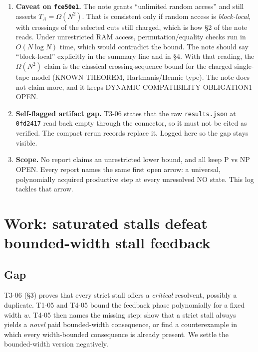 \documentclass[11pt]{article}
\theoremstyle{definition}
\begin{document}
\begin{enumerate}
 (e) T3-06 critical-pair lemma. At a stall $m_v\le b_v$, so a critical partner exists, the resolvent is false at $a$, its width is $\le|C|+|D|-2$, and $\sum_v m_vb_v\ge\sum_v m_v^2$. Correct. The Fano width-4 remark is correct: two distinct lines meet in exactly one point.
 (f) Arithmetic: RANDOM residue versus table aggregate events $440691/349518=1.2609$, matching the stated $+26.1\%$.
\item \textbf{Caveat on \texttt{fce50e1}.} The note grants ``unlimited random access'' and still asserts $T_A=\Omega(N^2)$. That is consistent only if random access is \emph{block-local}, with crossings of the selected cuts still charged, which is how \S2 of the note reads. Under unrestricted RAM access, permutation/equality checks run in $O(N\log N)$ time, which would contradict the bound. The note should say ``block-local'' explicitly in the summary line and in \S4. With that reading, the $\Omega(N^2)$ claim is the classical crossing-sequence bound for the charged single-tape model (KNOWN THEOREM, Hartmanis/Hennie type). The note does not claim more, and it keeps DYNAMIC-COMPATIBILITY-OBLIGATION1 OPEN.
\item \textbf{Self-flagged artifact gap.} T3-06 states that the raw \texttt{results.json} at \texttt{0fd2417} read back empty through the connector, so it must not be cited as verified. The compact rerun records replace it. Logged here so the gap stays visible.
\item \textbf{Scope.} No report claims an unrestricted lower bound, and all keep P vs NP OPEN. Every report names the same first open arrow: a universal, polynomially acquired productive step at every unresolved NO state. This log tackles that arrow.
\end{enumerate}

\section{Work: saturated stalls defeat bounded-width stall feedback}\label{sec:work}
\subsection*{Gap}
T3-06 (\S3) proves that every strict stall offers a \emph{critical} resolvent, possibly a duplicate. T1-05 and T4-05 bound the feedback phase polynomially for a fixed width $w$. T4-05 then names the missing step: show that a strict stall always yields a \emph{novel} paid bounded-width consequence, or find a counterexample in which every width-bounded consequence is already present. We settle the bounded-width version negatively.
\end{document}
